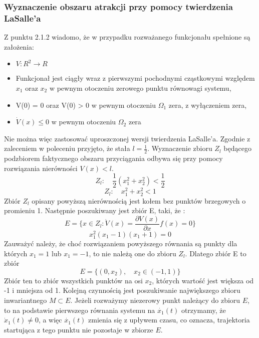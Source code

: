 \documentclass[a4paper,11pt]{article}
\begin{document}
\subsubsection{Wyznaczenie obszaru atrakcji przy pomocy twierdzenia LaSalle'a}
Z punktu 2.1.2 wiadomo, że w przypadku rozważanego funkcjonału spełnione są założenia: 
\begin{itemize}
\item \( V : R^{2} \rightarrow R \)
\item Funkcjonał jest ciągły wraz z pierwszymi pochodnymi cząstkowymi względem \(x_{1}\) oraz \(x_{2}\) w pewnym otoczeniu zerowego punktu równowagi systemu, 
\item V(0) = 0 oraz V(0) > 0 w pewnym otoczeniu \(\Omega_{1}\) zera, z wyłączeniem zera, 
\item \( \dot{V}(x) \leq 0 \) w pewnym otoczeniu \( \Omega_{2}\) zera
\end{itemize}
Nie można więc zastosować uproszczonej wersji twierdzenia LaSalle'a. Zgodnie z zaleceniem w poleceniu przyjęto, że stała \( l = \frac{1}{2} \). Wyznaczenie zbioru \( Z_{l} \) będącego podzbiorem faktycznego obszaru przyciągania odbywa się przy pomocy rozwiązania nierówności \( V(x) < l \). 
\begin{equation*}
Z_{l}: \quad \frac{1}{2}(x_{1}^{2}+x_{2}^{2})<\frac{1}{2}
\end{equation*}
\begin{equation*}
Z_{l}: \quad  x_{1}^{2}+x_{2}^{2}<1
\end{equation*}
Zbiór \(Z_{l}\) opisany powyższą nierównością jest kołem bez punktów brzegowych o promieniu 1.
Następnie poszukiwany jest zbiór E, taki, że : 
\begin{equation*}
E = \{ x \in Z_{l} : \dot{V}(x)=\frac{\partial V(x)}{\partial x} f(x) =0 \}
\end{equation*}
\begin{equation*}
x_{1}^{2}(x_{1}-1)(x_{1}+1)=0
\end{equation*}
Zauważyć należy, że choć rozwiązaniem powyższego równania są punkty dla których \( x_{1} = 1 \) lub \( x_{1} = -1 \), to nie należą one do zbioru \( Z_{l} \). Dlatego zbiór E to zbiór 
\begin{equation}
E = \{ (0,x_{2}), \quad x_{2} \in ( -1 , 1 ) \}
\end{equation} 
Zbiór ten to zbiór wszystkich punktów na osi \( x_{2} \), których wartość jest większa od -1 i mniejsza od 1. 
Kolejną czynnością jest poszukiwanie największego zbioru inwariantnego \( M \subset E \).
Jeżeli rozważymy niezerowy punkt należący do zbioru \( E \), to na podstawie pierwszego równania systemu na \( \dot{x_{1}}(t) \) otrzymamy, że  \( \dot{x}_{1}(t) \neq 0 \), a więc  \( \dot{x_{1}}(t) \) zmienia się z upływem czasu, co oznacza, trajektoria startująca z tego punktu nie pozostaje w zbiorze \( E \). 
\end{document}
